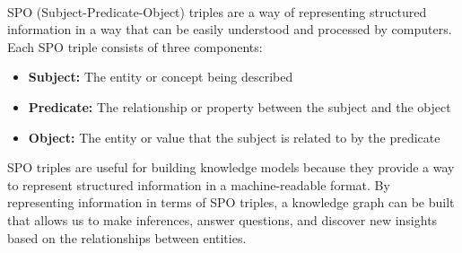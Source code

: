 \paragraph{} SPO (Subject-Predicate-Object) triples are a way of representing structured information in a way that can be easily understood and processed by computers. Each SPO triple consists of three components:
\begin{itemize}
    \item \textbf{Subject:} The entity or concept being described
    \item \textbf{Predicate:} The relationship or property between the subject and the object
    \item \textbf{Object:} The entity or value that the subject is related to by the predicate
\end{itemize}
SPO triples are useful for building knowledge models because they provide a way to represent structured information in a machine-readable format. By representing information in terms of SPO triples, a knowledge graph can be built that allows us to make inferences, answer questions, and discover new insights based on the relationships between entities. 

